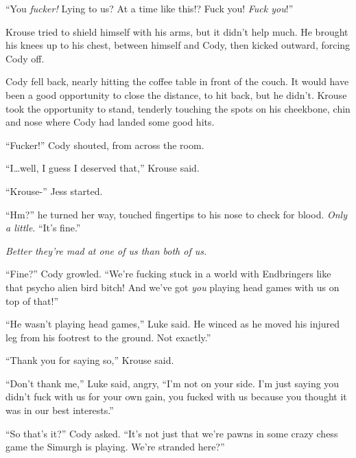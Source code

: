 ``You \emph{fucker!  }Lying to us?  At a time like this!?  Fuck you!  \emph{Fuck you}!''



Krouse tried to shield himself with his arms, but it didn't help much.  He brought his knees up to his chest, between himself and Cody, then kicked outward, forcing Cody off.



Cody fell back, nearly hitting the coffee table in front of the couch.  It would have been a good opportunity to close the distance, to hit back, but he didn't.  Krouse took the opportunity to stand, tenderly touching the spots on his cheekbone, chin and nose where Cody had landed some good hits.



``Fucker!''  Cody shouted, from across the room.



``I\ldots well, I guess I deserved that,'' Krouse said.



``Krouse-'' Jess started.



``Hm?'' he turned her way, touched fingertips to his nose to check for blood.  \emph{Only a little}.  ``It's fine.''



\emph{Better they're mad at one of us than both of us.}



``Fine?'' Cody growled.  ``We're fucking stuck in a world with Endbringers like that psycho alien bird bitch!  And we've got \emph{you} playing head games with us on top of that!''



``He wasn't playing head games,'' Luke said.  He winced as he moved his injured leg from his footrest to the ground.  Not exactly.''



``Thank you for saying so,'' Krouse said.



``Don't thank me,'' Luke said, angry, ``I'm not on your side.  I'm just saying you didn't fuck with us for your own gain, you fucked with us because you thought it was in our best interests.''



``So that's it?'' Cody asked.  ``It's not just that we're pawns in some crazy chess game the Simurgh is playing.  We're stranded here?''



